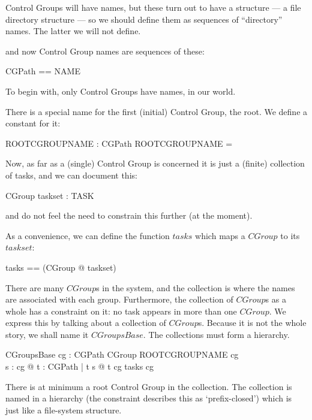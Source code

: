 \documentclass[a4paper,twoside,12pt]{article}
\begin{document}
Control Groups will have names, but these turn out to have a structure --- a file directory structure --- so we should define them as sequences of ``directory'' names. The latter we will not define.

\begin{zed}
[NAME]
\end{zed}
and now Control Group names are sequences of these:

\begin{zed}
CGPath == \seq NAME
\end{zed}

To begin with, only Control Groups have names, in our world.

There is a special name for the first (initial) Control Group, the root. We define a constant for it:

\begin{axdef}{}
ROOTCGROUPNAME : CGPath
\where
ROOTCGROUPNAME = \langle \rangle
\end{axdef}

Now, as far as a (single) Control Group is concerned it is just a (finite) collection of tasks, and we can document this:

\begin{schema}{CGroup}
taskset : \finset TASK
\end{schema}
and do not feel the need to constrain this further (at the moment).

As a convenience, we can define the function $tasks$ which maps a $CGroup$ to its $taskset$:
\begin{zed}
tasks == (\lambda CGroup @ taskset)
\end{zed}

There are many $CGroup$s in the system, and the collection is where the names are associated with each group. Furthermore, the collection of $CGroup$s as a whole has a constraint on it: no task appears in more than one $CGroup$. We express this by talking about a collection of $CGroup$s. Because it is not the whole story, we shall name it $CGroupsBase$. The collections must form a hierarchy.

\begin{schema}{CGroupsBase}
cg : CGPath \ffun CGroup
\where
ROOTCGROUPNAME \in \dom cg \\
\forall s : \dom cg @ \forall t : CGPath | t \subset s @ t \in \dom cg
\also
\disjoint tasks \circ cg
\end{schema}

There is at minimum a root Control Group in the collection.  The collection is named in a hierarchy (the constraint describes this as `prefix-closed') which is just like a file-system structure.
\end{document}
